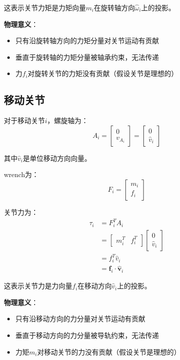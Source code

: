 \documentclass[12pt,a4paper]{article}
\begin{document}
这表示关节力矩是力矩向量$m_i$在旋转轴方向$\hat{\omega}_i$上的投影。

\textbf{物理意义}：
\begin{itemize}
\item 只有沿旋转轴方向的力矩分量对关节运动有贡献
\item 垂直于旋转轴的力矩分量被轴承约束，无法传递
\item 力$f_i$对旋转关节的力矩没有贡献（假设关节是理想的）
\end{itemize}

\subsection{移动关节}

对于移动关节$i$，螺旋轴为：
\begin{equation}
A_i = \begin{bmatrix}
0 \\
v_{A_i}
\end{bmatrix} = \begin{bmatrix}
0 \\
\hat{v}_i
\end{bmatrix}
\end{equation}

其中$\hat{v}_i$是单位移动方向向量。

wrench为：
\begin{equation}
F_i = \begin{bmatrix}
m_i \\
f_i
\end{bmatrix}
\end{equation}

关节力为：
\begin{align}
\tau_i &= F_i^T A_i \\
&= \begin{bmatrix} m_i^T & f_i^T \end{bmatrix} \begin{bmatrix} 0 \\ \hat{v}_i \end{bmatrix} \\
&= f_i^T \hat{v}_i \\
&= \bm{f}_i \cdot \hat{\bm{v}}_i
\end{align}

这表示关节力是力向量$f_i$在移动方向$\hat{v}_i$上的投影。

\textbf{物理意义}：
\begin{itemize}
\item 只有沿移动方向的力分量对关节运动有贡献
\item 垂直于移动方向的力分量被导轨约束，无法传递
\item 力矩$m_i$对移动关节的力没有贡献（假设关节是理想的）
\end{itemize}
\end{document}
